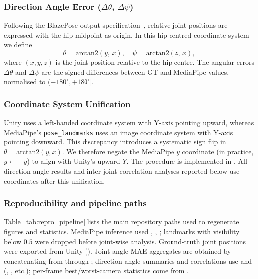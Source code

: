 \documentclass[english,fleqn]{ieej-e}
\begin{document}
\subsubsection{Direction Angle Error ($\Delta\theta$, $\Delta\psi$)}

Following the BlazePose output specification~\cite{blazepose}, relative
joint positions are expressed with the hip midpoint as origin. In this
hip-centred coordinate system we define
\begin{equation}
  \theta = \mathrm{arctan2}(y,\,x), \quad
  \psi   = \mathrm{arctan2}(z,\,x),
  \label{eq:direction_angles}
\end{equation}
where $(x,y,z)$ is the joint position relative to the hip centre.
The angular errors $\Delta\theta$ and $\Delta\psi$ are the signed
differences between GT and MediaPipe values, normalised to
$(-180^{\circ}, +180^{\circ}]$.

\subsubsection{Coordinate System Unification}

Unity uses a left-handed coordinate system with Y-axis pointing
upward, whereas MediaPipe's \texttt{pose\_landmarks} uses an image
coordinate system with Y-axis pointing downward. This discrepancy
introduces a systematic sign flip in $\theta = \mathrm{arctan2}(y,x)$.
We therefore negate the MediaPipe $y$ coordinate (in practice,
$y \leftarrow -y$) to align with Unity's upward $Y$.
The procedure is implemented in
.
All direction angle results and inter-joint correlation analyses reported
below use coordinates after this unification.

\subsubsection{Reproducibility and pipeline paths}

Table~\ref{tab:repro_pipeline} lists the main repository paths used to
regenerate figures and statistics. MediaPipe inference used
, ,
; landmarks with visibility below $0.5$
were dropped before joint-wise analysis. Ground-truth joint positions were
exported from Unity (). Joint-angle MAE aggregates are
obtained by concatenating  from
 through ; direction-angle
summaries and correlations use
 and
(, , etc.); per-frame
best/worst-camera statistics come from .
\end{document}
